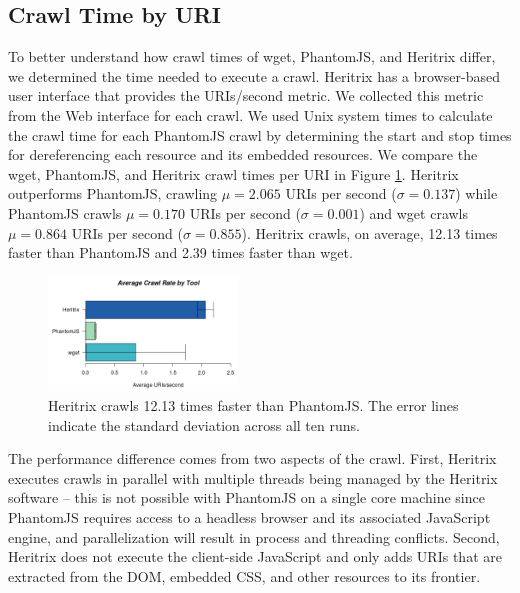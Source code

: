 \documentclass{ipres_proc_article-sp}
\begin{document}

\subsection{Crawl Time by URI}
\label{clock}
To better understand how crawl times of wget, PhantomJS, and Heritrix differ, we determined the time needed to execute a crawl. Heritrix has a browser-based user interface that provides the URIs/second metric. We collected this metric from the Web interface for each crawl. We used Unix system times to calculate the crawl time for each PhantomJS crawl by determining the start and stop times for dereferencing each resource and its embedded resources. We compare the wget, PhantomJS, and Heritrix crawl times per URI in Figure \ref{crawlrate}. Heritrix outperforms PhantomJS, crawling $\mu=2.065$ URIs per second ($\sigma = 0.137$) while PhantomJS crawls $\mu=0.170$ URIs per second ($\sigma = 0.001$) and wget crawls $\mu=0.864$ URIs per second ($\sigma = 0.855$). Heritrix crawls, on average, 12.13 times faster than PhantomJS and 2.39 times faster than wget.

\begin{figure}
  \begin{center}
    	\includegraphics[width=0.45\textwidth,keepaspectratio]{./imgs/rateBarStats.png}
  \end{center}
  \caption{Heritrix crawls 12.13 times faster than PhantomJS. The error lines indicate the standard deviation across all ten runs.}
  \label{crawlrate}
\end{figure}

The performance difference comes from two aspects of the crawl. First, Heritrix executes crawls in parallel with multiple threads being managed by the Heritrix software -- this is not possible with PhantomJS on a single core machine since PhantomJS requires access to a headless browser and its associated JavaScript engine, and parallelization will result in process and threading conflicts. Second, Heritrix does not execute the client-side JavaScript and only adds URIs that are extracted from the DOM, embedded CSS, and other resources to its frontier. 
\end{document}
